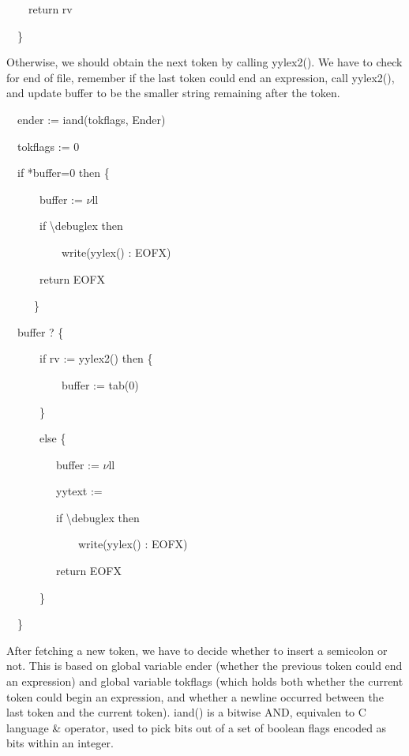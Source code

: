 {\ttfamily\mdseries
\ \ \ \ return rv}

{\ttfamily\mdseries
\ \ \}}

Otherwise, we should obtain the next token by calling yylex2(). We
have to check for end of file, remember if the last token could end an
expression, call yylex2(), and update buffer to be the smaller string
remaining after the token.

{\ttfamily\mdseries
\ \ ender := iand(tokflags, Ender)}

{\ttfamily\mdseries
\ \ tokflags := 0}

{\ttfamily\mdseries
\ \ if *buffer=0 then \{}

{\ttfamily\mdseries
\ \ \ \ \ \ buffer := $\nu $ll}

{\ttfamily\mdseries
\ \ \ \ \ \ if {\textbackslash}debuglex then}

{\ttfamily\mdseries
\ \ \ \ \ \ \ \ \ \ write({\textquotedbl}yylex() : EOFX{\textquotedbl})}

{\ttfamily\mdseries
\ \ \ \ \ \ return EOFX}

{\ttfamily\mdseries
\ \ \ \ \ \}}

{\ttfamily\mdseries
\ \ buffer ? \{}

{\ttfamily\mdseries
\ \ \ \ \ \ if rv := yylex2() then \{}

{\ttfamily\mdseries
\ \ \ \ \ \ \ \ \ \ buffer := tab(0)}

{\ttfamily\mdseries
\ \ \ \ \ \ \}}

{\ttfamily\mdseries
\ \ \ \ \ \ else \{}

{\ttfamily\mdseries
\ \ \ \ \ \ \ \ \ buffer := $\nu $ll}

{\ttfamily\mdseries
\ \ \ \ \ \ \ \ \ yytext := {\textquotedbl}{\textquotedbl}}

{\ttfamily\mdseries
\ \ \ \ \ \ \ \ \ if {\textbackslash}debuglex then}

{\ttfamily\mdseries
\ \ \ \ \ \ \ \ \ \ \ \ \ write({\textquotedbl}yylex() : EOFX{\textquotedbl})}

{\ttfamily\mdseries
\ \ \ \ \ \ \ \ \ return EOFX}

{\ttfamily\mdseries
\ \ \ \ \ \ \}}

{\ttfamily\mdseries
\ \ \}}

After fetching a new token, we have to decide whether to insert a
semicolon or not. This is based on global variable ender (whether the
previous token could end an expression) and global variable tokflags
(which holds both whether the current token could begin an expression,
and whether a newline occurred between the last token and the current
token).  iand() is a bitwise AND, equivalen to C language \& operator,
used to pick bits out of a set of boolean flags encoded as bits within
an integer.

